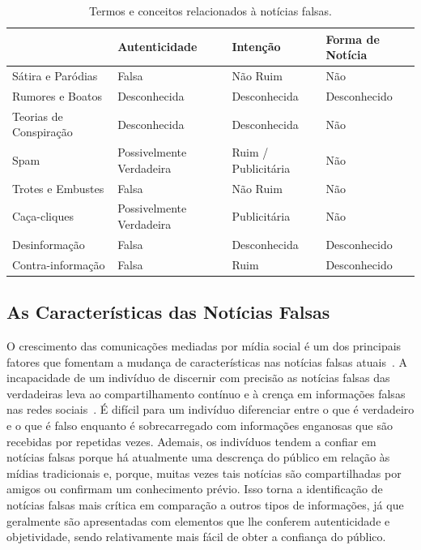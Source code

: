 \documentclass{SBCbookchapter}
\begin{document}
\begin{table}[h!]
\centering
\caption{Termos e conceitos relacionados à notícias falsas.}
\label{tab:comp}
\footnotesize
\begin{tabular}{|M{.27\textwidth}|M{.18\textwidth}|M{.22\textwidth}|M{.22\textwidth}|}
 & \textbf{Autenticidade}  & \textbf{Intenção} & \textbf{Forma de Notícia}  \\ 
\hline 
Sátira e Paródias      & Falsa                  & Não Ruim          & Não               \\ 
\hline
Rumores e Boatos       & Desconhecida           & Desconhecida      & Desconhecido      \\ 
\hline
Teorias de Conspiração & Desconhecida           & Desconhecida      & Não               \\ 
\hline
Spam                   & Possivelmente Verdadeira   & Ruim / Publicitária & Não               \\ 
\hline
Trotes e Embustes      & Falsa        & Não Ruim          & Não               \\ 
\hline
Caça-cliques           & Possivelmente Verdadeira   & Publicitária      & Não               \\ 
\hline
Desinformação         & Falsa                  & Desconhecida      & Desconhecido      \\ 
\hline
Contra-informação         & Falsa                  & Ruim              & Desconhecido     \\
\hline
\end{tabular}
\end{table}

\subsection{As Características das Notícias Falsas}

O crescimento das comunicações mediadas por mídia social é um dos principais fatores que fomentam a mudança de características nas notícias falsas atuais~\cite{sharma2019combating}. A incapacidade de um indivíduo de discernir com precisão as notícias falsas das verdadeiras leva ao compartilhamento contínuo e à crença em informações falsas nas redes sociais~\cite{zhou2018fake,wang2017liar,rubin2010deception,rubin2016fake}. É difícil para um indivíduo diferenciar entre o que é verdadeiro e o que é falso enquanto é sobrecarregado com informações enganosas que são recebidas por repetidas vezes. Ademais, os indivíduos tendem a confiar em notícias falsas porque há atualmente uma descrença do público em relação às mídias tradicionais e, porque, muitas vezes tais notícias são compartilhadas por amigos ou confirmam um conhecimento prévio. Isso torna a identificação de notícias falsas mais crítica em comparação a outros tipos de informações, já que geralmente são apresentadas com elementos que lhe conferem autenticidade e objetividade, sendo relativamente mais fácil de obter a confiança do público.
\end{document}

